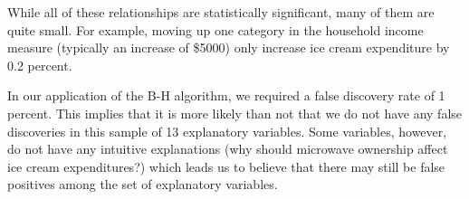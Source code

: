 \documentclass[11pt, fleqn]{article}
\begin{document}
While all of these relationships are statistically significant, many of them are quite small. For example, moving up one category in the household income measure (typically an increase of \$5000) only increase ice cream expenditure by 0.2 percent.

In our application of the B-H algorithm, we required a false discovery rate of 1 percent. This implies that it is more likely than not that we do not have any false discoveries in this sample of 13 explanatory variables. Some variables, however, do not have any intuitive explanations (why should microwave ownership affect ice cream expenditures?) which leads us to believe that there may still be false positives among the set of explanatory variables.
\end{document}
